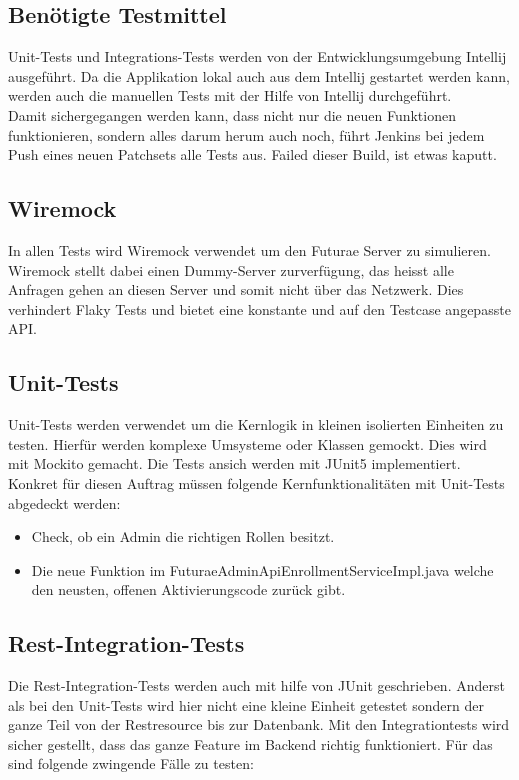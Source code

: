 \subsection{Benötigte Testmittel}
Unit-Tests und Integrations-Tests werden von der Entwicklungsumgebung Intellij ausgeführt. Da die Applikation lokal auch aus dem Intellij gestartet werden kann, werden auch die manuellen Tests mit der Hilfe von Intellij durchgeführt.  \newline
\\
Damit sichergegangen werden kann, dass nicht nur die neuen Funktionen funktionieren, sondern alles darum herum auch noch, führt Jenkins bei jedem Push eines neuen Patchsets alle Tests aus. Failed dieser Build, ist etwas kaputt.

\subsection{Wiremock}
In allen Tests wird Wiremock verwendet um den Futurae Server zu simulieren. Wiremock stellt dabei einen Dummy-Server zurverfügung, das heisst alle Anfragen gehen an diesen Server und somit nicht über das Netzwerk. Dies verhindert Flaky Tests und bietet eine konstante und auf den Testcase angepasste API. 

\subsection{Unit-Tests}
Unit-Tests werden verwendet um die Kernlogik in kleinen isolierten Einheiten zu testen. Hierfür werden komplexe Umsysteme oder Klassen gemockt. Dies wird mit Mockito gemacht. Die Tests ansich werden mit JUnit5 implementiert. Konkret für diesen Auftrag müssen folgende Kernfunktionalitäten mit Unit-Tests abgedeckt werden:
\begin{itemize}
	\item Check, ob ein Admin die richtigen Rollen besitzt.
	\item Die neue Funktion im FuturaeAdminApiEnrollmentServiceImpl.java welche den neusten, offenen Aktivierungscode zurück gibt.	
\end{itemize}

\subsection{Rest-Integration-Tests}
Die Rest-Integration-Tests werden auch mit hilfe von JUnit geschrieben. Anderst als bei den Unit-Tests wird hier nicht eine kleine Einheit getestet sondern der ganze Teil von der Restresource bis zur Datenbank.
Mit den Integrationtests wird sicher gestellt, dass das ganze Feature im Backend richtig funktioniert. Für das sind folgende zwingende Fälle zu testen:

